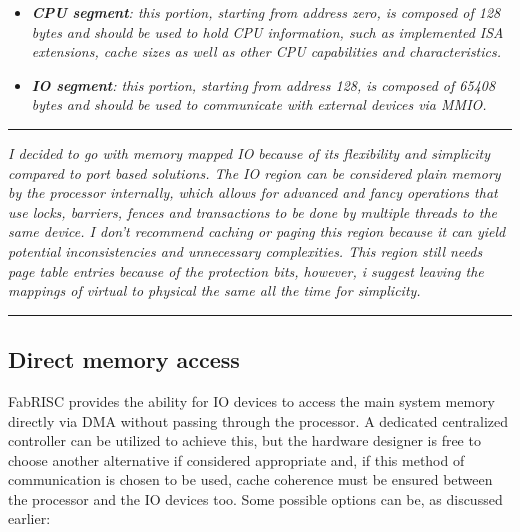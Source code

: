 \documentclass{article}
\begin{document}
            \begin{itemize}

                \item \textit{\textbf{CPU segment}: this portion, starting from address zero, is composed of 128 bytes and should be used to hold CPU information, such as implemented ISA extensions, cache sizes as well as other CPU capabilities and characteristics.}

                \item \textit{\textbf{IO segment}: this portion, starting from address 128, is composed of 65408 bytes and should be used to communicate with external devices via MMIO.}

            \end{itemize}

            \vspace{10pt}
            
            \vspace{10pt}

        \par\noindent\rule{\textwidth}{0.4pt}
        \textit{I decided to go with memory mapped IO because of its flexibility and simplicity compared to port based solutions. The IO region can be considered plain memory by the processor internally, which allows for advanced and fancy operations that use locks, barriers, fences and transactions to be done by multiple threads to the same device. I don't recommend caching or paging this region because it can yield potential inconsistencies and unnecessary complexities. This region still needs page table entries because of the protection bits, however, i suggest leaving the mappings of virtual to physical the same all the time for simplicity.}
        \par\noindent\rule{\textwidth}{0.4pt}

        \subsection{Direct memory access}

            \vspace{10pt}

            FabRISC provides the ability for IO devices to access the main system memory directly via DMA without passing through the processor. A dedicated centralized controller can be utilized to achieve this, but the hardware designer is free to choose another alternative if considered appropriate and, if this method of communication is chosen to be used, cache coherence must be ensured between the processor and the IO devices too. Some possible options can be, as discussed earlier:
\end{document}
